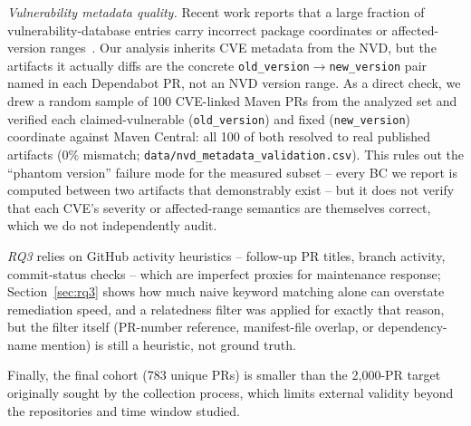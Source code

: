\documentclass[10pt,journal]{IEEEtran}
\begin{document}
\emph{Vulnerability metadata quality.} Recent work reports that a large fraction of vulnerability-database entries carry incorrect package coordinates or affected-version ranges~\cite{nvdquality2026}. Our analysis inherits CVE metadata from the NVD, but the artifacts it actually diffs are the concrete \texttt{old\_version}$\to$\texttt{new\_version} pair named in each Dependabot PR, not an NVD version range. As a direct check, we drew a random sample of 100 CVE-linked Maven PRs from the analyzed set and verified each claimed-vulnerable (\texttt{old\_version}) and fixed (\texttt{new\_version}) coordinate against Maven Central: all 100 of both resolved to real published artifacts (0\% mismatch; \texttt{data/nvd\_metadata\_validation.csv}). This rules out the ``phantom version'' failure mode for the measured subset -- every BC we report is computed between two artifacts that demonstrably exist -- but it does not verify that each CVE's severity or affected-range semantics are themselves correct, which we do not independently audit.

\emph{RQ3} relies on GitHub activity heuristics -- follow-up PR titles, branch activity, commit-status checks -- which are imperfect proxies for maintenance response; Section~\ref{sec:rq3} shows how much naive keyword matching alone can overstate remediation speed, and a relatedness filter was applied for exactly that reason, but the filter itself (PR-number reference, manifest-file overlap, or dependency-name mention) is still a heuristic, not ground truth.

Finally, the final cohort (783 unique PRs) is smaller than the 2{,}000-PR target originally sought by the collection process, which limits external validity beyond the repositories and time window studied.
\end{document}
